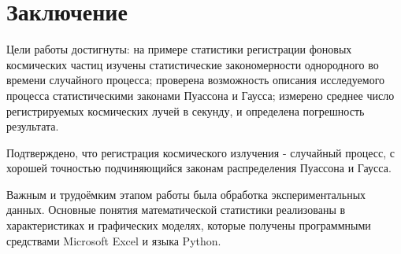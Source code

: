 \documentclass{report}
\begin{document}
	
	
	\section*{Заключение}
	\hspace{4mm} Цели работы достигнуты: на примере статистики регистрации фоновых космических частиц изучены статистические закономерности однородного во времени случайного процесса; проверена возможность описания исследуемого процесса статистическими законами Пуассона и Гаусса; измерено среднее число регистрируемых космических лучей в секунду, и определена погрешность результата. 
	
	Подтверждено, что регистрация космического излучения - случайный процесс, с хорошей точностью подчиняющийся законам распределения Пуассона и Гаусса. 
	
	Важным и трудоёмким этапом работы была обработка экспериментальных данных. Основные понятия математической статистики реализованы в характеристиках и графических моделях, которые получены программными средствами Microsoft Excel и языка Python.
	
	
	
	
	
	
\end{document}
